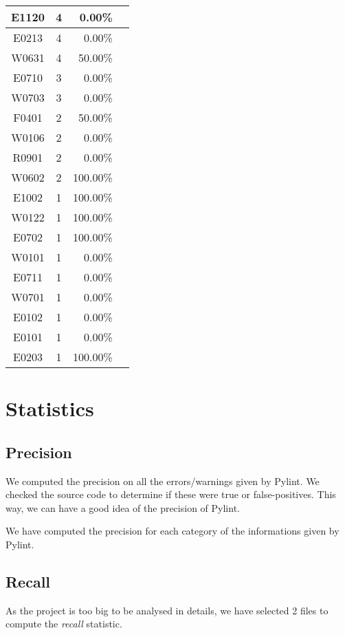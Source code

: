 \documentclass[11pt, a4paper]{article}
\newcommand{\tit}[1]{\textit{#1}}
\newcommand{\pyl}{\textsf{Pylint}}
\begin{document}
\begin{longtable}{|c|c|r|m{9.2cm}|}
\hline
E1120 & 4 & 0.00\% &  \\
\hline
E0213 & 4 & 0.00\% &  \\
\hline
W0631 & 4 & 50.00\% &  \\
\hline
E0710 & 3 & 0.00\% &  \\
\hline
W0703 & 3 & 0.00\% &  \\
\hline
F0401 & 2 & 50.00\% &  \\
\hline
W0106 & 2 & 0.00\% &  \\
\hline
R0901 & 2 & 0.00\% &  \\
\hline
W0602 & 2 & 100.00\% &  \\
\hline
E1002 & 1 & 100.00\% &  \\
\hline
W0122 & 1 & 100.00\% &  \\
\hline
E0702 & 1 & 100.00\% &  \\
\hline
W0101 & 1 & 0.00\% &  \\
\hline
E0711 & 1 & 0.00\% &  \\
\hline
W0701 & 1 & 0.00\% &  \\
\hline
E0102 & 1 & 0.00\% &  \\
\hline
E0101 & 1 & 0.00\% &  \\
\hline
E0203 & 1 & 100.00\% &  \\
\hline
\end{longtable}


\section{Statistics}

\subsection*{Precision}

We computed the precision on all the errors/warnings given by \pyl{}.
We checked the source code to determine if these were true or false-positives.
This way, we can have a good idea of the precision of \pyl{}.

We have computed the precision for each category of the informations given by \pyl{}.


\subsection*{Recall}

As the project is too big to be analysed in details, we have selected 2 files to compute the \tit{recall} statistic.
\end{document}
